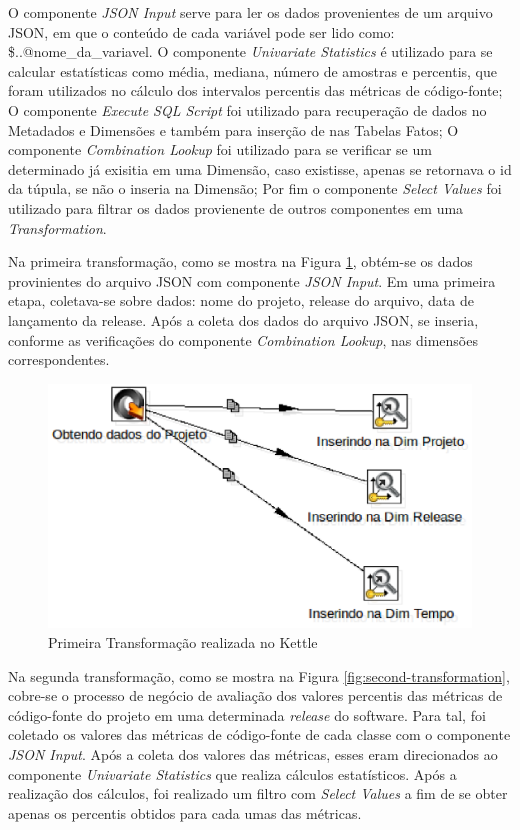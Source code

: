 \begin{apendicesenv}
O componente \textit{JSON Input} serve para ler os dados provenientes de um arquivo JSON, em que o conteúdo de cada variável pode ser lido como: \$..@nome\_da\_variavel. O componente \textit{Univariate Statistics} é utilizado para se calcular estatísticas como média, mediana, número de amostras e percentis, que foram utilizados no cálculo dos intervalos percentis das métricas de código-fonte; O componente \textit{Execute SQL Script} foi utilizado para recuperação de dados no Metadados e Dimensões e também para inserção de nas Tabelas Fatos; O componente \textit{Combination Lookup} foi utilizado para se verificar se um determinado já exisitia em uma Dimensão, caso existisse, apenas se retornava o id da túpula, se não o inseria na Dimensão; Por fim o componente \textit{Select Values} foi utilizado para filtrar os dados provienente de outros componentes em uma \textit{Transformation}.


Na primeira transformação, como se mostra na Figura \ref{fig:first-transformation}, obtém-se os dados provinientes do arquivo JSON com componente \textit{JSON Input}. Em uma primeira etapa, coletava-se sobre dados: nome do projeto, release do arquivo, data de lançamento da release. Após a coleta dos dados do arquivo JSON, se inseria, conforme as verificações do componente \textit{Combination Lookup}, nas dimensões correspondentes.


\begin{figure}[H]
\centering
\includegraphics[keepaspectratio=false,scale=0.65]{figuras/first-transformation.eps}
\caption{Primeira Transformação realizada no Kettle}
\label{fig:first-transformation}
\end{figure}
\FloatBarrier

Na segunda transformação, como se mostra na Figura \ref{fig:second-transformation}, cobre-se o processo de negócio de avaliação dos valores percentis das métricas de código-fonte do projeto em uma determinada \textit{release} do software. Para tal, foi coletado os valores das métricas de código-fonte de cada classe com o componente \textit{JSON Input}. Após a coleta dos valores das métricas, esses eram direcionados ao componente \textit{Univariate Statistics} que realiza cálculos estatísticos. Após a realização dos cálculos, foi realizado um filtro com \textit{Select Values} a fim de se obter apenas os percentis obtidos para cada umas das métricas. 


\end{apendicesenv}
